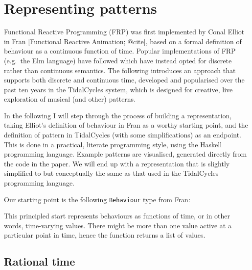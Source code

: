 \section{Representing patterns}\label{representing-patterns}

Functional Reactive Programming (FRP) was first implemented by Conal
Elliot in Fran {[}Functional Reactive Animation; @cite{]}, based on a
formal definition of behaviour as a continuous function of time. Popular
implementations of FRP (e.g.~the Elm language) have followed which have
instead opted for discrete rather than continuous semantics. The
following introduces an approach that supports both discrete and
continuous time, developed and popularised over the past ten years in
the TidalCycles system, which is designed for creative, live exploration
of musical (and other) patterns.

In the following I will step through the process of building a
representation, taking Elliot's definition of behaviour in Fran as a
worthy starting point, and the definition of pattern in TidalCycles
(with some simplifications) as an endpoint. This is done in a practical,
literate programming style, using the Haskell programming language.
Example patterns are visualised, generated directly from the code in the
paper. We will end up with a representation that is slightly simplified
to but conceptually the same as that used in the TidalCycles programming
language.

Our starting point is the following \texttt{Behaviour} type from Fran:

\begin{Shaded}
\begin{Highlighting}[]
  \OtherTok{=} 
 \OtherTok{=}  \OtherTok{{-}\textgreater{}}\NormalTok{ [a]}
\end{Highlighting}
\end{Shaded}

This principled start represents behaviours as functions of time, or in
other words, time-varying values. There might be more than one value
active at a particular point in time, hence the function returns a list
of values.

\subsection{Rational time}\label{rational-time}

